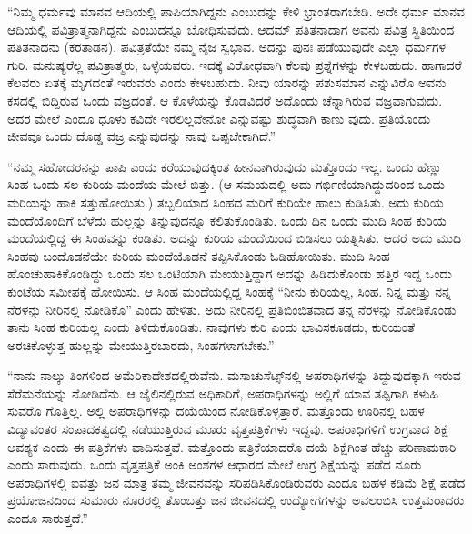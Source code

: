 “ನಿಮ್ಮ ಧರ್ಮವು ಮಾನವ ಆದಿಯಲ್ಲಿ ಪಾಪಿಯಾಗಿದ್ದನು ಎಂಬುದನ್ನು ಕೇಳಿ ಭ್ರಾಂತರಾಗಬೇಡಿ. ಅದೇ ಧರ್ಮ ಮಾನವ ಆದಿಯಲ್ಲಿ ಪವಿತ್ರಾತ್ಮನಾಗಿದ್ದನು ಎಂಬುದನ್ನೂ ಬೋಧಿಸುವುದು. ಆದಮ್​ ಪತಿತನಾದಾಗ ಅವನು ಪವಿತ್ರ ಸ್ಥಿತಿಯಿಂದ ಪತಿತನಾದನು (ಕರತಾಡನ). ಪವಿತ್ರತೆಯೇ ನಮ್ಮ ನೈಜ ಸ್ವಭಾವ. ಅದನ್ನು ಪುನಃ ಪಡೆಯುವುದೇ ಎಲ್ಲಾ ಧರ್ಮಗಳ ಗುರಿ. ಮನುಷ್ಯರೆಲ್ಲ ಪವಿತ್ರಾತ್ಮರು, ಒಳ್ಳೆಯವರು. ಇದಕ್ಕೆ ವಿರೋಧವಾಗಿ ಕೆಲವು ಪ್ರಶ್ನೆಗಳನ್ನು ಕೇಳಬಹುದು. ಹಾಗಾದರೆ ಕೆಲವರು ಏತಕ್ಕೆ ಮೃಗದಂತೆ ಇರುವರು ಎಂದು ಕೇಳಬಹುದು. ನೀವು ಯಾರನ್ನು ಪಶುಸಮಾನ ಎನ್ನುವಿರೊ ಅವನು ಕಸದಲ್ಲಿ ಬಿದ್ದಿರುವ ಒಂದು ವಜ್ರದಂತೆ. ಆ ಕೊಳೆಯನ್ನು ಕೊಡವಿದರೆ ಅದೊಂದು ಚೆನ್ನಾಗಿರುವ ವಜ್ರವಾಗುವುದು. ಅದರ ಮೇಲೆ ಎಂದೂ ಧೂಳು ಕವಿದೇ ಇರಲಿಲ್ಲವೇನೋ ಎನ್ನುವಷ್ಟು ಶುದ್ಧವಾಗಿ ಕಾಣು ವುದು. ಪ್ರತಿಯೊಂದು ಜೀವವೂ ಒಂದು ದೊಡ್ಡ ವಜ್ರ ಎನ್ನುವುದನ್ನು ನಾವು ಒಪ್ಪಬೇಕಾಗಿದೆ.”

“ನಮ್ಮ ಸಹೋದರನನ್ನು ಪಾಪಿ ಎಂದು ಕರೆಯುವುದಕ್ಕಿಂತ ಹೀನವಾಗಿರುವುದು ಮತ್ತೊಂದು ಇಲ್ಲ. ಒಂದು ಹೆಣ್ಣು ಸಿಂಹ ಒಂದು ಸಲ ಕುರಿಯ ಮಂದೆಯ ಮೇಲೆ ಬಿತ್ತು. (ಆ ಸಮಯದಲ್ಲಿ ಅದು ಗರ್ಭಿಣಿಯಾಗಿದ್ದುದರಿಂದ ಒಂದು ಮರಿಯನ್ನು ಹಾಕಿ ಸತ್ತುಹೋಯಿತು.) ತಬ್ಬಲಿಯಾದ ಸಿಂಹದ ಮರಿಗೆ ಕುರಿಯೇ ಹಾಲು ಕುಡಿಸಿತು. ಅದು ಕುರಿಯ ಮಂದೆಯೊಂದಿಗೆ ಬೆಳೆದು ಹುಲ್ಲನ್ನು ತಿನ್ನುವುದನ್ನೂ ಕಲಿತುಕೊಂಡಿತು. ಒಂದು ದಿನ ಒಂದು ಮುದಿ ಸಿಂಹ ಕುರಿಯ ಮಂದೆಯಲ್ಲಿದ್ದ ಈ ಸಿಂಹವನ್ನು ಕಂಡಿತು. ಅದನ್ನು ಕುರಿಯ ಮಂದೆಯಿಂದ ಬಿಡಿಸಲು ಯತ್ನಿಸಿತು. ಆದರೆ ಅದು ಮುದಿ ಸಿಂಹವು ಬಂದೊಡನೆಯೇ ಕುರಿಯ ಮಂದೆಯೊಡನೆ ತಪ್ಪಿಸಿಕೊಂಡು ಓಡಿಹೋಯಿತು. ಮುದಿ ಸಿಂಹ ಹೊಂಚುಹಾಕಿಕೊಂಡಿದ್ದು ಒಂದು ಸಲ ಒಂಟಿಯಾಗಿ ಮೇಯುತ್ತಿದ್ದಾಗ ಅದನ್ನು ಹಿಡಿದುಕೊಂಡು ಹತ್ತಿರ ಇದ್ದ ಒಂದು ಕುಂಟೆಯ ಸಮೀಪಕ್ಕೆ ಹೋಯಿಸು. ಆ ಸಿಂಹ ಮಂದೆಯಲ್ಲಿದ್ದ ಸಿಂಹಕ್ಕೆ “ನೀನು ಕುರಿಯಲ್ಲ, ಸಿಂಹ. ನಿನ್ನ ಮತ್ತು ನನ್ನ ನೆರಳನ್ನು ನೀರಿನಲ್ಲಿ ನೋಡಿಕೊ” ಎಂದು ಹೇಳಿತು. ಅದು ನೀರಿನಲ್ಲಿ ಪ್ರತಿಬಿಂಬಿತವಾದ ತನ್ನ ನೆರಳನ್ನು ನೋಡಿಕೊಂಡು ತಾನು ಸಿಂಹ ಕುರಿಯಲ್ಲ ಎಂದು ತಿಳಿದುಕೊಂಡಿತು. ನಾವುಗಳು ಕುರಿ ಎಂದು ಭಾವಿಸಕೂಡದು, ಕುರಿಯಂತೆ ಅರಚಿಕೊಳ್ಳುತ್ತ ಹುಲ್ಲನ್ನು ಮೇಯುತ್ತಿರಬಾರದು, ಸಿಂಹಗಳಾಗಬೇಕು.”

“ನಾನು ನಾಲ್ಕು ತಿಂಗಳಿಂದ ಅಮೆರಿಕಾದೇಶದಲ್ಲಿರುವೆನು. ಮಸಾಚುಸೆಟ್ಸ್​ನಲ್ಲಿ ಅಪರಾಧಿಗಳನ್ನು ತಿದ್ದುವುದಕ್ಕಾಗಿ ಇರುವ ಸೆರೆಮನೆಯನ್ನು ನೋಡಿದೆನು. ಆ ಜೈಲಿನಲ್ಲಿರುವ ಅಧಿಕಾರಿಗೆ, ಅಪರಾಧಿಗಳನ್ನು ಅಲ್ಲಿಗೆ ಯಾವ ತಪ್ಪಿಗಾಗಿ ಕಳುಹಿ ಸುವರೊ ಗೊತ್ತಿಲ್ಲ. ಅಲ್ಲಿ ಅಪರಾಧಿಗಳನ್ನು ದಯೆಯಿಂದ ನೋಡಿಕೊಳ್ಳತ್ತಾರೆ. ಮತ್ತೊಂದು ಊರಿನಲ್ಲಿ ಬಹಳ ವಿದ್ಯಾವಂತರ ಸಂಪಾದಕತ್ವದಲ್ಲಿ ನಡೆಯುತ್ತಿರುವ ಮೂರು ವೃತ್ತಪತ್ರಿಕೆಗಳು ಇದ್ದವು. ಅಪರಾಧಿಗಳಿಗೆ ಉಗ್ರವಾದ ಶಿಕ್ಷೆ ಅವಶ್ಯಕ ಎಂದು ಈ ಪತ್ರಿಕೆಗಳು ವಾದಿಸುತ್ತವೆ. ಮತ್ತೊಂದು ಪತ್ರಿಕೆಯಾದರೊ ದಯೆ ಶಿಕ್ಷೆಗಿಂತ ಹೆಚ್ಚು ಪರಿಣಾಮಕಾರಿ ಎಂದು ಸಾರುವುದು. ಒಂದು ವೃತ್ತಪತ್ರಿಕೆ ಅಂಕಿ ಅಂಶಗಳ ಆಧಾರದ ಮೇಲೆ ಉಗ್ರ ಶಿಕ್ಷೆಯನ್ನು ಪಡೆದ ನೂರು ಅಪರಾಧಿಗಳಲ್ಲಿ ಐವತ್ತು ಜನ ಮಾತ್ರ ತಮ್ಮ ಜೀವನವನ್ನು ಸರಿಪಡಿಸಿಕೊಂಡಿರುವರು ಎಂದೂ ಬಹಳ ಕಡಿಮೆ ಶಿಕ್ಷೆ ಪಡೆದ ಪ್ರಯೋಜನದಿಂದ ಸುಮಾರು ನೂರರಲ್ಲಿ ತೊಂಬತ್ತು ಜನ ಜೀವನದಲ್ಲಿ ಉದ್ಯೋಗಗಳನ್ನು ಅವಲಂಬಿಸಿ ಉತ್ತಮರಾದರು ಎಂದೂ ಸಾರುತ್ತದೆ.”

